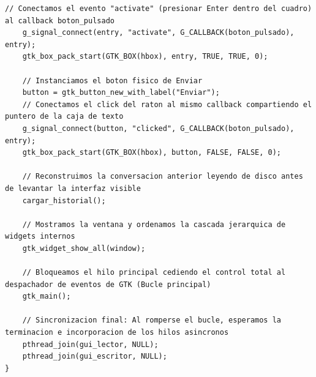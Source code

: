 \begin{lstlisting}[style=estiloC, caption={Archivo del Front-End (conexion P2P)}]
    // Conectamos el evento "activate" (presionar Enter dentro del cuadro) al callback boton_pulsado
    g_signal_connect(entry, "activate", G_CALLBACK(boton_pulsado), entry);
    gtk_box_pack_start(GTK_BOX(hbox), entry, TRUE, TRUE, 0);

    // Instanciamos el boton fisico de Enviar
    button = gtk_button_new_with_label("Enviar");
    // Conectamos el click del raton al mismo callback compartiendo el puntero de la caja de texto
    g_signal_connect(button, "clicked", G_CALLBACK(boton_pulsado), entry);
    gtk_box_pack_start(GTK_BOX(hbox), button, FALSE, FALSE, 0);

    // Reconstruimos la conversacion anterior leyendo de disco antes de levantar la interfaz visible
    cargar_historial();

    // Mostramos la ventana y ordenamos la cascada jerarquica de widgets internos
    gtk_widget_show_all(window);
    
    // Bloqueamos el hilo principal cediendo el control total al despachador de eventos de GTK (Bucle principal)
    gtk_main();

    // Sincronizacion final: Al romperse el bucle, esperamos la terminacion e incorporacion de los hilos asincronos
    pthread_join(gui_lector, NULL);
    pthread_join(gui_escritor, NULL);
}
\end{lstlisting}